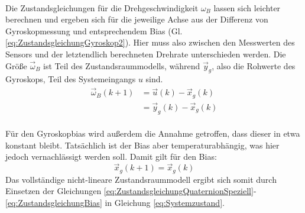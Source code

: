 \documentclass[12pt,a4paper]{article}
\begin{document}
		\\
		Die Zustandsgleichungen für die Drehgeschwindigkeit $\omega_{B}$ lassen sich leichter berechnen und ergeben sich für die jeweilige Achse aus der Differenz von Gyroskopmessung und entsprechendem Bias (Gl. \ref{eq:ZustandsgleichungGyroskop2}). Hier muss also zwischen den Messwerten des Sensors und der letztendlich berechneten Drehrate unterschieden werden. Die Größe $\vec{\omega}_{B}$ ist Teil des Zustandsraummodells, während $\vec{y}_{g}$, also die Rohwerte des Gyroskops, Teil des Systemeingangs $u$ sind.
		\begin{align}
			\vec{\omega}_{B}(k+1)&=\vec{u}(k)-\vec{x}_{g}(k)\label{eq:ZustandsgleichungGyroskop1}\\
			&=\vec{y}_{g}(k)-\vec{x}_{g}(k)\label{eq:ZustandsgleichungGyroskop2}
		\end{align}
		\\
		Für den Gyroskopbias wird außerdem die Annahme getroffen, dass dieser in etwa konstant bleibt. Tatsächlich ist der Bias aber temperaturabhängig, was hier jedoch vernachlässigt werden soll. Damit gilt für den Bias:
		\begin{equation}\label{eq:ZustandsgleichungBias}
			\vec{x}_{g}(k+1)=\vec{x}_{g}(k)
		\end{equation}
		Das vollständige nicht-lineare Zustandsraummodell ergibt sich somit durch Einsetzen der Gleichungen \ref{eq:ZustandsgleichungQuaternionSpeziell}-\ref{eq:ZustandsgleichungBias} in Gleichung \ref{eq:Systemzustand}.
\end{document}
